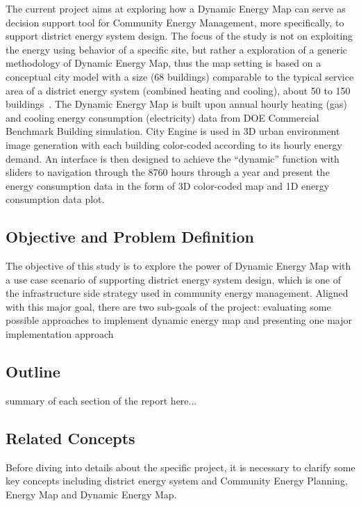 \documentclass[hidelinks,12pt]{article}
\newcommand{\grey}[1]{\textcolor{black!30}{#1}}
\begin{document}
The current project aims at exploring how a Dynamic Energy Map can
serve as decision support tool for Community Energy Management, more
specifically, to support district energy system design. The focus of
the study is not on exploiting the energy using behavior of a specific
site, but rather a exploration of a generic methodology of Dynamic
Energy Map, thus the map setting is based on a conceptual city model
with a size (68 buildings) comparable to the typical service area of a
district energy system (combined heating and cooling), about 50 to 150
buildings~\cite{IDEA2005}. The Dynamic Energy Map is built upon annual
hourly heating (gas) and cooling energy consumption (electricity) data
from DOE Commercial Benchmark Building simulation. City Engine is used
in 3D urban environment image generation with each building
color-coded according to its hourly energy demand. An interface is
then designed to achieve the ``dynamic'' function with sliders to
navigation through the 8760 hours through a year and present the
energy consumption data in the form of 3D color-coded map and 1D
energy consumption data plot.

\subsection{Objective and Problem Definition}
The objective of this study is to explore the power of Dynamic Energy
Map with a use case scenario of supporting district energy system
design, which is one of the infrastructure side strategy used in
community energy management. Aligned with this major goal, there are
two sub-goals of the project: evaluating some possible approaches to
implement dynamic energy map and presenting one major implementation
approach
\subsection{Outline}

\grey{summary of each section of the report here...}

\subsection{Related Concepts}
Before diving into details about the specific project, it is necessary
to clarify some key concepts including district energy system and
Community Energy Planning, Energy Map and Dynamic Energy Map.
\end{document}
